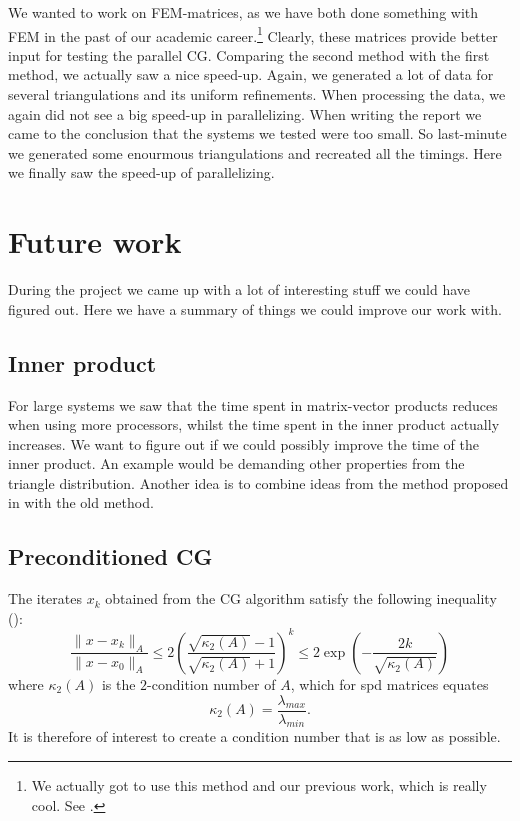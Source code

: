 \documentclass[11pt]{amsart}
\theoremstyle{definition}
\begin{document}
We wanted to work on FEM-matrices, as we have both done something with FEM in the past of our academic career.\footnote{We actually got to use this method and our previous work, which is really cool. See \cite{rayscriptie,janadapt}.} Clearly, these matrices provide better input for testing the parallel CG. Comparing the second method with the first method, we actually saw a nice speed-up. Again, we generated a lot of data for several triangulations and its uniform refinements. When processing the data, we again did not see a big speed-up in parallelizing. When writing the report we came to the conclusion that the systems we tested were too small. So last-minute we generated some enourmous triangulations and recreated all the timings. Here we finally saw the speed-up of parallelizing.

\section{Future work}
\label{sec:future}
During the project we came up with a lot of interesting stuff we could have figured out. Here we have a summary of things we could improve our work with.
\subsection{Inner product}
For large systems we saw that the time spent in matrix-vector products reduces when using more processors, whilst the time spent in the inner product actually increases. We want to figure out if we could possibly improve the time of the inner product. An example would be demanding other properties from the triangle distribution. Another idea is to combine ideas from the method proposed in \cite[Ex~1.1]{biss04} with the old method.
\subsection{Preconditioned CG}
The iterates $x_k$ obtained from the CG algorithm satisfy the following inequality (\cite[Lect.~7]{sleij}):
\[
  \frac{\|x - x_k\|_A}{\|x - x_0\|_A} \leq 2 \left( \frac{ \sqrt{\kappa_2(A)}-1}{\sqrt{\kappa_2(A)}+1}\right)^k \leq 2 \exp \left( -\frac{2k}{\sqrt{\kappa_2(A)}}\right) 
\]
where $\kappa_2(A)$ is the $2$-condition number of $A$, which for spd matrices equates
\[
  \kappa_2(A) = \frac{\lambda_{max}}{\lambda_{min}}.
\]
It is therefore of interest to create a condition number that is as low as possible.
\end{document}
